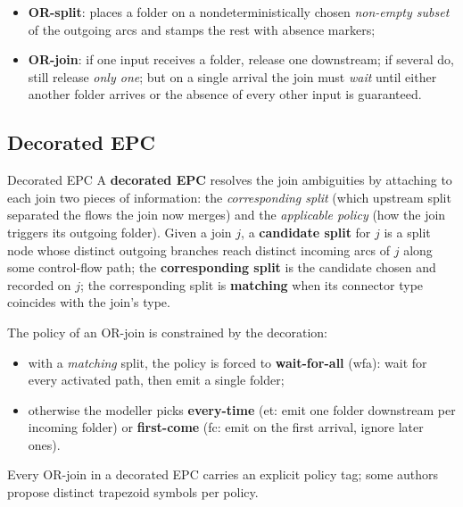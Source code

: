 \begin{itemize}
  \item \textbf{OR-split}: places a folder on a nondeterministically chosen \emph{non-empty subset} of the outgoing arcs and stamps the rest with absence markers;
  \item \textbf{OR-join}: if one input receives a folder, release one downstream; if several do, still release \emph{only one}; but on a single arrival the join must \emph{wait} until either another folder arrives or the absence of every other input is guaranteed.
\end{itemize}

\subsection{Decorated EPC}

\begin{definitionbox}{Decorated EPC}
A \textbf{decorated EPC} resolves the join ambiguities by attaching to each join two pieces of information: the \emph{corresponding split} (which upstream split separated the flows the join now merges) and the \emph{applicable policy} (how the join triggers its outgoing folder). Given a join $j$, a \textbf{candidate split} for $j$ is a split node whose distinct outgoing branches reach distinct incoming arcs of $j$ along some control-flow path; the \textbf{corresponding split} is the candidate chosen and recorded on $j$; the corresponding split is \textbf{matching} when its connector type coincides with the join's type.
\end{definitionbox}

The policy of an OR-join is constrained by the decoration:
\begin{itemize}
  \item with a \emph{matching} split, the policy is forced to \textbf{wait-for-all} (wfa): wait for every activated path, then emit a single folder;
  \item otherwise the modeller picks \textbf{every-time} (et: emit one folder downstream per incoming folder) or \textbf{first-come} (fc: emit on the first arrival, ignore later ones).
\end{itemize}
Every OR-join in a decorated EPC carries an explicit policy tag; some authors propose distinct trapezoid symbols per policy.

